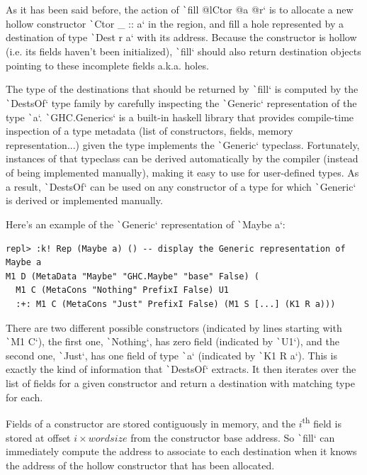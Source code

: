 \documentclass[english]{jflart}
\begin{document}
As it has been said before, the action of \texttt`fill @lCtor @a @r` is to allocate a new hollow constructor \texttt`Ctor _ :: a` in the region, and fill a hole represented by a destination of type \texttt`Dest r a` with its address. Because the constructor is hollow (i.e. its fields haven't been initialized), \texttt`fill` should also return destination objects pointing to these incomplete fields a.k.a. holes.

The type of the destinations that should be returned by \texttt`fill` is computed by the \texttt`DestsOf` type family by carefully inspecting the \texttt`Generic` representation of the type \texttt`a`. \texttt`GHC.Generics` is a built-in haskell library that provides compile-time inspection of a type metadata (list of constructors, fields, memory representation...) given the type implements the \texttt`Generic` typeclass. Fortunately, instances of that typeclass can be derived automatically by the compiler (instead of being implemented manually), making it easy to use for user-defined types. As a result, \texttt`DestsOf` can be used on any constructor of a type for which \texttt`Generic` is derived or implemented manually.

Here's an example of the \texttt`Generic` representation of \texttt`Maybe a`:

{\small
\begin{verbatim}
repl> :k! Rep (Maybe a) () -- display the Generic representation of Maybe a
M1 D (MetaData "Maybe" "GHC.Maybe" "base" False) (
  M1 C (MetaCons "Nothing" PrefixI False) U1
  :+: M1 C (MetaCons "Just" PrefixI False) (M1 S [...] (K1 R a)))
\end{verbatim}
}

There are two different possible constructors (indicated by lines starting with \texttt`M1 C`), the first one, \texttt`Nothing`, has zero field (indicated by \texttt`U1`), and the second one, \texttt`Just`, has one field of type \texttt`a` (indicated by \texttt`K1 R a`). This is exactly the kind of information that \texttt`DestsOf` extracts. It then iterates over the list of fields for a given constructor and return a destination with matching type for each.

Fields of a constructor are stored contiguously in memory, and the $i$\textsuperscript{th} field is stored at offset $i \times wordsize$ from the constructor base address. So \texttt`fill` can immediately compute the address to associate to each destination when it knows the address of the hollow constructor that has been allocated.
\end{document}
